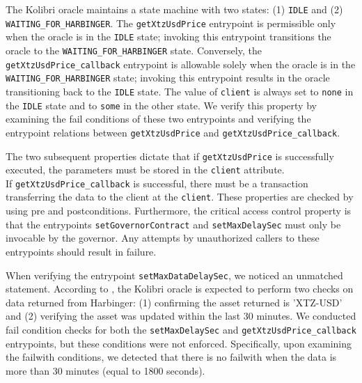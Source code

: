 \documentclass[runningheads]{llncs}
\begin{document}
The Kolibri oracle maintains a state machine with two states: (1) \lstinline/IDLE/ and (2) \lstinline/WAITING_FOR_HARBINGER/. The \lstinline/getXtzUsdPrice/ entrypoint is permissible only when the oracle is in the \lstinline/IDLE/ state; invoking this entrypoint transitions the oracle to the \lstinline/WAITING_FOR_HARBINGER/ state. Conversely, the\\ \lstinline/getXtzUsdPrice_callback/ entrypoint is allowable solely when the oracle is in the \lstinline/WAITING_FOR_HARBINGER/ state; invoking this entrypoint results in the oracle transitioning back to the \lstinline/IDLE/ state. The value of \lstinline/client/ is always set to \lstinline/none/ in the \lstinline/IDLE/ state and to \lstinline/some/ in the other state. We verify this property by examining the fail conditions of these two entrypoints and verifying the entrypoint relations between \lstinline/getXtzUsdPrice/ and \lstinline/getXtzUsdPrice_callback/.

The two subsequent properties dictate that if \lstinline/getXtzUsdPrice/ is successfully executed, the parameters must be stored in the \lstinline/client/ attribute. \\ If \lstinline/getXtzUsdPrice_callback/ is successful, there must be a transaction transferring the data to the client at the \lstinline/client/. These properties are checked by using pre and postconditions. Furthermore, the critical access control property is that the entrypoints \lstinline/setGovernorContract/ and \lstinline/setMaxDelaySec/ must only be invocable by the governor. Any attempts by unauthorized callers to these entrypoints should result in failure.

When verifying the entrypoint \lstinline/setMaxDataDelaySec/, we noticed an unmatched statement. According to \cite{kolibri}, the Kolibri oracle is expected to perform two checks on data returned from Harbinger: (1) confirming the asset returned is 'XTZ-USD' and (2) verifying the asset was updated within the last 30 minutes. We conducted fail condition checks for both the \lstinline/setMaxDelaySec/ and \lstinline/getXtzUsdPrice_callback/ entrypoints, but these conditions were not enforced. Specifically, upon examining the failwith conditions, we detected that there is no failwith when the data is more than 30 minutes (equal to 1800 seconds). 
\end{document}
